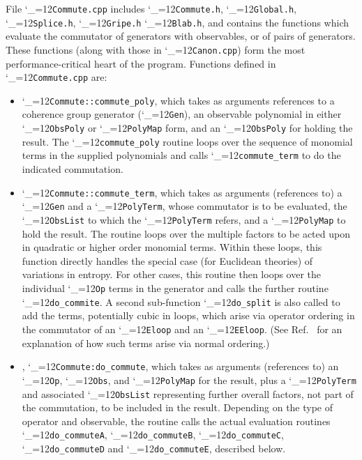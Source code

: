\documentclass [12pt]{article}
\makeatletter
\renewcommand{\tt}{\begingroup\catcode`_=12\def\_{\string_}\tt@}
\newcommand{\tt@}[1]{\texttt{#1}\endgroup}
\makeatother
\begin{document}
File \tt{Commute.cpp} includes
\tt{Commute.h},
\tt{Global.h},
\tt{Splice.h},
\tt{Gripe.h}
\tt{Blab.h},
and contains the functions which
evaluate the commutator of generators with observables,
or of pairs of generators.
These functions (along with those in \tt{Canon.cpp})
form the most performance-critical heart of the program.
Functions defined in \tt{Commute.cpp} are:
\begin{itemize}
\item
    \tt{Commute::commute_poly}, which takes as arguments
    references to a coherence group generator (\tt{Gen}),
    an observable polynomial in either \tt{ObsPoly} or \tt{PolyMap} form,
    and an \tt{ObsPoly} for holding the result.
    The \tt{commute_poly} routine loops over the sequence
    of monomial terms in the supplied polynomials
    and calls \tt{commute_term} to do the indicated commutation.

\item
    \tt{Commute::commute_term}, which takes as arguments
    (references to)
    a \tt{Gen} and a \tt{PolyTerm}, whose commutator is to be
    evaluated, the \tt{ObsList} to which the \tt{PolyTerm} refers,
    and a \tt{PolyMap} to hold the result.
    The routine loops over the multiple factors to be acted upon
    in quadratic or higher order monomial terms.
    Within these loops, this function
    directly handles the special case
    (for Euclidean theories) of variations in entropy.
    For other cases, this routine then loops over the individual
    \tt{Op} terms in the generator and calls the further routine
    \tt{do_commite}.
    A second sub-function \tt{do_split} is also called
    to add the terms, potentially cubic in loops, which
    arise via operator ordering in the commutator of an \tt{Eloop}
    and an \tt{EEloop}.
    (See Ref.~\cite{CSVAII} for an explanation
    of how such terms arise via normal ordering.)

\item,
    \tt{Commute:do_commute}, which takes as arguments (references to)
    an \tt{Op}, \tt{Obs}, and \tt{PolyMap} for the result,
    plus a \tt{PolyTerm} and associated \tt{ObsList} representing
    further overall factors, not part of the commutation, to be 
    included in the result.
    Depending on the type of operator and observable,
    the routine calls the actual evaluation routines
    \tt{do_commuteA},
    \tt{do_commuteB},
    \tt{do_commuteC},
    \tt{do_commuteD} and
    \tt{do_commuteE},
    described below.


\end{itemize}
\end{document}

